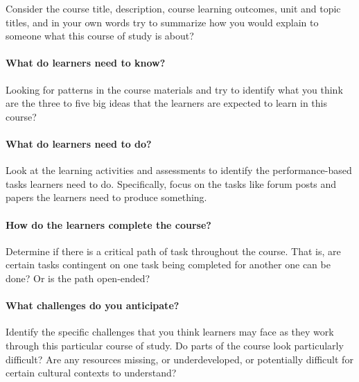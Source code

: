 \documentclass[
]{book}
\begin{document}
Consider the course title, description, course learning outcomes, unit and topic titles, and in your own words try to summarize how you would explain to someone what this course of study is about?

\hypertarget{what-do-learners-need-to-know}{%
\paragraph{What do learners need to know?}\label{what-do-learners-need-to-know}}

Looking for patterns in the course materials and try to identify what you think are the three to five big ideas that the learners are expected to learn in this course?

\hypertarget{what-do-learners-need-to-do}{%
\paragraph{What do learners need to do?}\label{what-do-learners-need-to-do}}

Look at the learning activities and assessments to identify the performance-based tasks learners need to do. Specifically, focus on the tasks like forum posts and papers the learners need to produce something.

\hypertarget{how-do-the-learners-complete-the-course}{%
\paragraph{How do the learners complete the course?}\label{how-do-the-learners-complete-the-course}}

Determine if there is a critical path of task throughout the course. That is, are certain tasks contingent on one task being completed for another one can be done? Or is the path open-ended?

\hypertarget{what-challenges-do-you-anticipate}{%
\paragraph{What challenges do you anticipate?}\label{what-challenges-do-you-anticipate}}

Identify the specific challenges that you think learners may face as they work through this particular course of study. Do parts of the course look particularly difficult? Are any resources missing, or underdeveloped, or potentially difficult for certain cultural contexts to understand?
\end{document}
